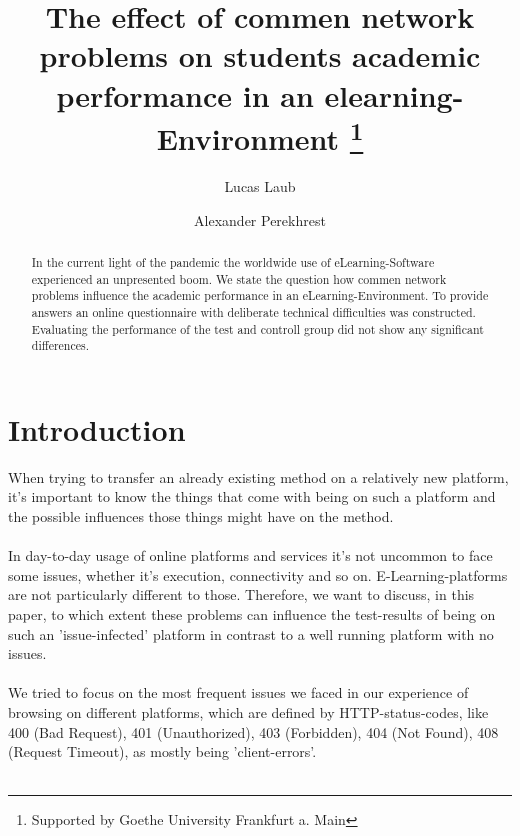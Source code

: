 \documentclass[runningheads]{llncs}
\begin{document}
\title{The effect of commen network problems on students academic performance in an elearning-Environment \thanks{Supported by Goethe University Frankfurt a. Main}}

\author{Lucas Laub \and
Alexander Perekhrest }


\maketitle

\begin{abstract}
In the current light of the pandemic the worldwide use
of eLearning-Software experienced an unpresented boom.
We state the question how commen network problems influence
the academic performance in an eLearning-Environment.
To provide answers an online questionnaire with deliberate
technical difficulties was constructed. Evaluating the performance
of the test and controll group did not show any significant
differences.
\end{abstract}


\section{Introduction}
When trying to transfer an already existing method on a relatively new platform, 
it's important to know the things that come with being on such a platform and the 
possible influences those things might have on the method.\\\\

In day-to-day usage of online platforms and services it's not uncommon to face some 
issues, whether it's execution, connectivity and so on. E-Learning-platforms are not 
particularly different to those. Therefore, we want to discuss, in this paper, to 
which extent these problems can influence the test-results of being on such an 
'issue-infected' platform in contrast to a well running platform with no issues.\\\\

We tried to focus on the most frequent issues we faced in our experience of browsing 
on different platforms, which are defined by HTTP-status-codes, like 400 (Bad Request), 401 
(Unauthorized), 403 (Forbidden), 404 (Not Found), 408 (Request Timeout), as mostly being 'client-errors'.\\\\
\end{document}
